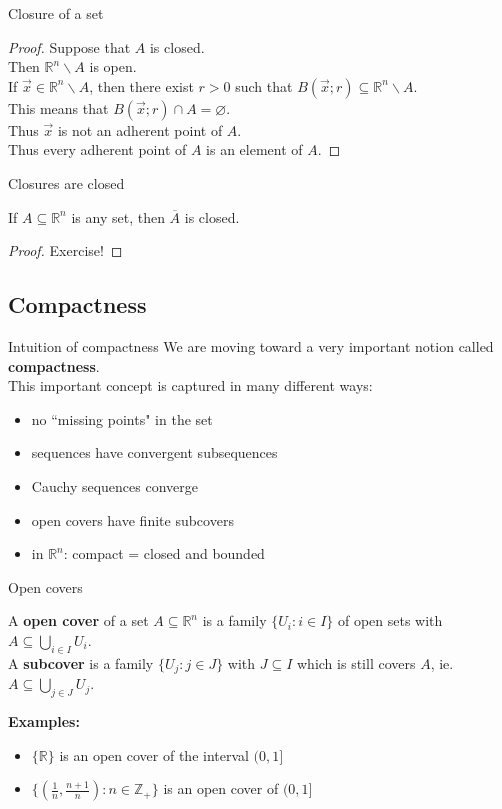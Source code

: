 \documentclass{beamer}
\begin{document}
\begin{frame}{Closure of a set}
\begin{proof}
Suppose that $A$ is closed.\\
Then $\mathbb{R}^n\backslash A$ is open.\\
If $\vec x\in \mathbb{R}^n\backslash A$, then there exist $r > 0$ such that $B(\vec x; r)\subseteq \mathbb{R}^n\backslash A$.\\
This means that $B(\vec x; r)\cap A = \varnothing$.\\
Thus $\vec x$ is not an adherent point of $A$.\\
Thus every adherent point of $A$ is an element of $A$.
\end{proof}
\end{frame}

\begin{frame}{Closures are closed}
\begin{thm}
If $A\subseteq \mathbb{R}^n$ is any set, then $\overline{A}$ is closed.
\end{thm}
\begin{proof}
Exercise!
\end{proof}
\end{frame}

\subsection{Compactness}

\begin{frame}{Intuition of compactness}
We are moving toward a very important notion called \textbf{compactness}.\\
\pause
This important concept is captured in many different ways:
\begin{itemize}
\pause
\item no ``missing points" in the set
\pause
\item sequences have convergent subsequences
\pause
\item Cauchy sequences converge
\pause
\item open covers have finite subcovers
\pause
\item in $\mathbb{R}^n$: compact = closed and bounded
\end{itemize}
\end{frame}


\begin{frame}{Open covers}
\begin{defn}
A \textbf{open cover} of a set $A\subseteq\mathbb{R}^n$ is a family $\{U_i: i\in I\}$ of open sets with $A\subseteq \bigcup_{i\in I} U_i$.\\\pause
A \textbf{subcover} is a family $\{U_j: j\in J\}$ with $J\subseteq I$ which is still covers $A$, ie. $A\subseteq \bigcup_{j\in J} U_j$.
\end{defn}
\pause
\textbf{Examples:}
\begin{itemize}
\pause
\item $\{\mathbb{R}\}$ is an open cover of the interval $(0,1]$
\pause
\item $\{(\frac{1}{n},\frac{n+1}{n}): n\in\mathbb{Z}_+\}$ is an open cover of $(0,1]$
\end{itemize}
\end{frame}
\end{document}
